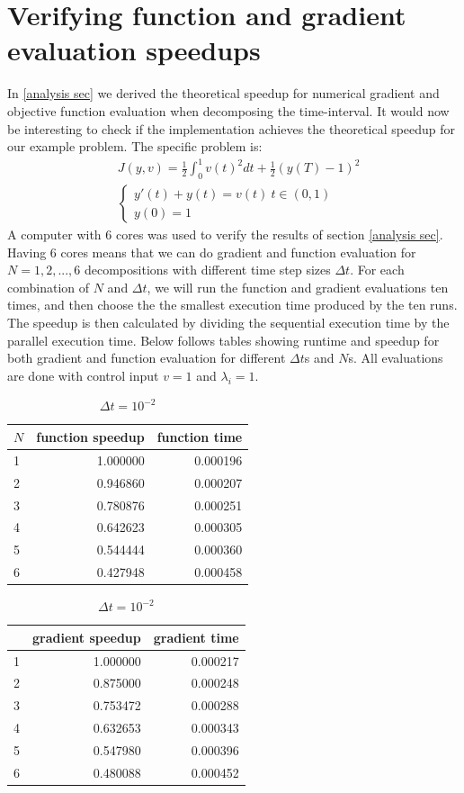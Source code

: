 \section{Verifying function and gradient evaluation speedups} \label{ver S sec}
In \ref{analysis sec} we derived the theoretical speedup for numerical gradient and objective function evaluation when decomposing the time-interval. It would now be interesting to check if the implementation achieves the theoretical speedup for our example problem. The specific problem is:
\begin{align*}
&J(y,v) = \frac{1}{2}\int_0^1v(t)^2dt + \frac{1}{2}(y(T)-1)^2 \\
&\left\{
     \begin{array}{lr}
       	y'(t)+y(t) = v(t) \ t\in(0,1)\\
       	y(0)=1
     \end{array}
   \right. 
\end{align*}
A computer with 6 cores was used to verify the results of section \ref{analysis sec}. Having 6 cores means that we can do gradient and function evaluation for $N=1,2,...,6$ decompositions with different time step sizes $\Delta t$. For each combination of $N$ and $\Delta t$, we will run the function and gradient evaluations ten times, and then choose the the smallest execution time produced by the ten runs. The speedup is then calculated by dividing the sequential execution time by the parallel execution time. Below follows tables showing runtime and speedup for both gradient and function evaluation for different $\Delta t$s and $N$s. All evaluations are done with control input $v=1$ and $\lambda_i=1$.  
\\
\begin{table}[!h]
\centering
\caption{$\Delta t=10^{-2}$}
\begin{tabular}{lrr}
\toprule
{} $N$&   function speedup &      function time \\
\midrule
1 &  1.000000 &  0.000196 \\
2 &  0.946860 &  0.000207 \\
3 &  0.780876 &  0.000251 \\
4 &  0.642623 &  0.000305 \\
5 &  0.544444 &  0.000360 \\
6 &  0.427948 &  0.000458 \\
\bottomrule
\end{tabular}
\begin{tabular}{lrr}
\toprule
{} &  gradient speedup &     gradient time \\
\midrule
1 &  1.000000 &  0.000217 \\
2 &  0.875000 &  0.000248 \\
3 &  0.753472 &  0.000288 \\
4 &  0.632653 &  0.000343 \\
5 &  0.547980 &  0.000396 \\
6 &  0.480088 &  0.000452 \\
\bottomrule
\end{tabular}
\end{table}
